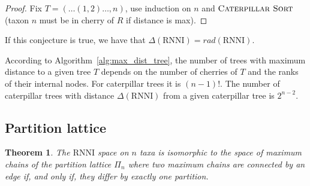 \documentclass{amsart}
\newcommand{\rnni}{\mathrm{RNNI}}
\newcommand{\csort}{\textsc{Caterpillar Sort}}
\newtheorem{theorem}[definition]{Theorem}
\begin{document}
\begin{proof}
    Fix $T = (\ldots(1,2) \ldots ,n)$, use induction on $n$ and $\csort$ (taxon $n$ must be in cherry of $R$ if distance is max).
\end{proof}

If this conjecture is true, we have that $\Delta(\rnni) = rad(\rnni)$.

According to Algorithm~\ref{alg:max_dist_tree}, the number of trees with maximum distance to a given tree $T$ depends on the number of cherries of $T$ and the ranks of their internal nodes.
For caterpillar trees it is $(n-1)!$.
The number of caterpillar trees with distance $\Delta(\rnni)$ from a given caterpillar tree is $2^{n-2}$.





\subsection{Partition lattice}


\begin{theorem}
	The $\rnni$ space on $n$ taxa is isomorphic to the space of maximum chains of the partition lattice $\Pi_n$ where two maximum chains are connected by an edge if, and only if, they differ by exactly one partition.
\end{theorem}


\printbibliography
\end{document}
